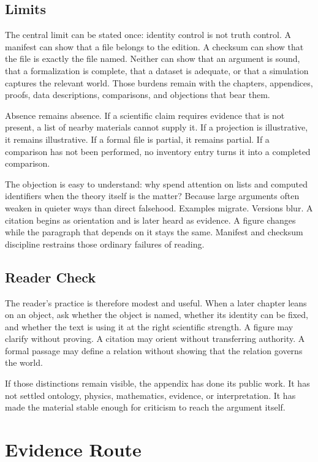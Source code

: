 \documentclass[11pt,a4paper,openany]{book}
\begin{document}
\subsection{Limits}
The central limit can be stated once: identity control is not truth control. A manifest can show that a file belongs to the edition. A checksum can show that the file is exactly the file named. Neither can show that an argument is sound, that a formalization is complete, that a dataset is adequate, or that a simulation captures the relevant world. Those burdens remain with the chapters, appendices, proofs, data descriptions, comparisons, and objections that bear them. \cite{kadanoff_scaling,wilson_renormalization}\par
Absence remains absence. If a scientific claim requires evidence that is not present, a list of nearby materials cannot supply it. If a projection is illustrative, it remains illustrative. If a formal file is partial, it remains partial. If a comparison has not been performed, no inventory entry turns it into a completed comparison.\par
The objection is easy to understand: why spend attention on lists and computed identifiers when the theory itself is the matter? Because large arguments often weaken in quieter ways than direct falsehood. Examples migrate. Versions blur. A citation begins as orientation and is later heard as evidence. A figure changes while the paragraph that depends on it stays the same. Manifest and checksum discipline restrains those ordinary failures of reading.\par
\subsection{Reader Check}
The reader's practice is therefore modest and useful. When a later chapter leans on an object, ask whether the object is named, whether its identity can be fixed, and whether the text is using it at the right scientific strength. A figure may clarify without proving. A citation may orient without transferring authority. A formal passage may define a relation without showing that the relation governs the world. \cite{kadanoff_scaling,wilson_renormalization}\par
If those distinctions remain visible, the appendix has done its public work. It has not settled ontology, physics, mathematics, evidence, or interpretation. It has made the material stable enough for criticism to reach the argument itself.\par
\section{Evidence Route}
\end{document}
